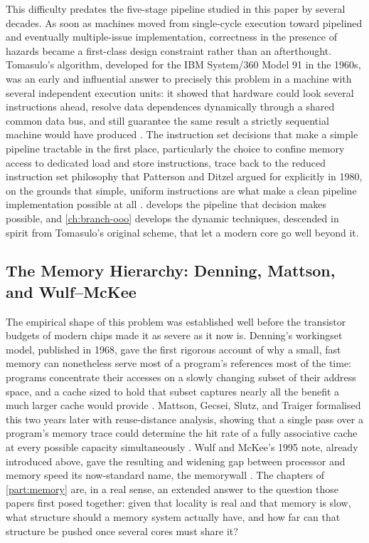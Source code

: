 \documentclass[12pt,a4paper]{report}
\begin{document}
This difficulty predates the five-stage pipeline studied in this paper
by several decades. As soon as machines moved from single-cycle
execution toward pipelined and eventually multiple-issue implementation,
correctness in the presence of hazards became a first-class design
constraint rather than an afterthought. Tomasulo's algorithm, developed
for the IBM System/360 Model 91 in the 1960s, was an early and
influential answer to precisely this problem in a machine with several
independent execution units: it showed that hardware could look several
instructions ahead, resolve data dependences dynamically through a
shared common data bus, and still guarantee the same result a strictly
sequential machine would have produced \cite{tomasulo1967}. The
instruction set decisions that make a simple pipeline tractable in the
first place, particularly the choice to confine memory access to
dedicated load and store instructions, trace back to the reduced
instruction set philosophy that Patterson and Ditzel argued for
explicitly in 1980, on the grounds that simple, uniform instructions are
what make a clean pipeline implementation possible at all
\cite{pattersonditzel1980}.  develops the
pipeline that decision makes possible, and \cref{ch:branch-ooo} develops
the dynamic techniques, descended in spirit from Tomasulo's original
scheme, that let a modern core go well beyond it.

\subsection{The Memory Hierarchy: Denning, Mattson, and Wulf--McKee}

The empirical shape of this problem was established well before the
transistor budgets of modern chips made it as severe as it now is.
Denning's \gls{workingset} model, published in 1968, gave the first rigorous
account of why a small, fast memory can nonetheless serve most of a
program's references most of the time: programs concentrate their
accesses on a slowly changing subset of their address space, and a cache
sized to hold that subset captures nearly all the benefit a much larger
cache would provide \cite{denning1968}. Mattson, Gecsei, Slutz, and
Traiger formalised this two years later with reuse-distance analysis,
showing that a single pass over a program's memory trace could
determine the hit rate of a fully associative cache at every possible
capacity simultaneously \cite{mattson1970}. Wulf and McKee's 1995 note,
already introduced above, gave the resulting and widening gap between
processor and memory speed its now-standard name, the \gls{memorywall}
\cite{wulfmckee1995}. The chapters of \cref{part:memory} are, in a
real sense, an extended answer to the question those papers first posed
together: given that locality is real and that memory is slow, what
structure should a memory system actually have, and how far can that
structure be pushed once several cores must share it?
\end{document}
